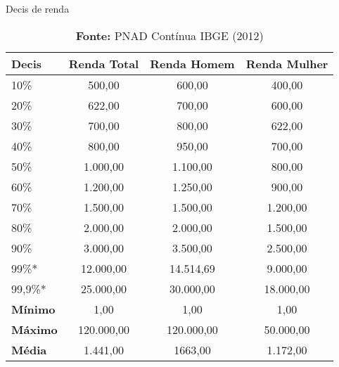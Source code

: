 \documentclass[xcolor={dvipsnames}]{beamer}
\begin{document}
\begin{frame}{Decis de renda}
    \begin{table}[!h]
    \caption{Decis de renda da população total e por gênero (em R\$)\\
    Região Sudeste}
    \begin{adjustbox}{width=0.6\columnwidth,center}
    \begin{tabular}{lccc} \hline
    \textbf{Decis} & \textbf{Renda Total} & \textbf{Renda Homem} & \textbf{Renda Mulher}\\\hline
    10\%           & 500,00     & 600,00     & 400,00    \\
    20\%           & 622,00     & 700,00     & 600,00    \\
    30\%           & 700,00     & 800,00     & 622,00    \\
    40\%           & 800,00     & 950,00     & 700,00    \\
    50\%           & 1.000,00   & 1.100,00   & 800,00    \\
    60\%           & 1.200,00   & 1.250,00   & 900,00    \\
    70\%           & 1.500,00   & 1.500,00   & 1.200,00  \\
    80\%           & 2.000,00   & 2.000,00   & 1.500,00  \\
    90\%           & 3.000,00   & 3.500,00   & 2.500,00  \\\hline
    99\%*          & 12.000,00  & 14.514,69  & 9.000,00  \\ 
    99,9\%*        & 25.000,00  & 30.000,00  & 18.000,00 \\\hline
    \textbf{Mínimo}& 1,00       & 1,00       & 1,00      \\ 
    \textbf{Máximo}& 120.000,00 & 120.000,00 & 50.000,00 \\
    \textbf{Média} & 1.441,00   & 1663,00    & 1.172,00  \\\hline
    \end{tabular}
    \end{adjustbox}
    \caption*{\textbf{Fonte:} PNAD Contínua IBGE (2012)}
\end{table}
\end{frame}
\end{document}
